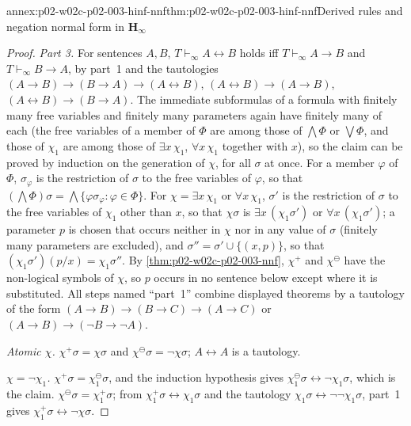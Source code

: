 \begin{annexitem}{annex:p02-w02c-p02-003-hinf-nnf}{thm:p02-w02c-p02-003-hinf-nnf}{Derived rules and negation normal form in \(\mathbf H_{\infty}\)}
\begin{proof}
\emph{Part 3.}  For sentences \(A,B\), \(T\vdash_{\infty}A\leftrightarrow B\)
holds iff \(T\vdash_{\infty}A\to B\) and \(T\vdash_{\infty}B\to A\), by
part~1 and the tautologies \((A\to B)\to(B\to A)\to(A\leftrightarrow B)\),
\((A\leftrightarrow B)\to(A\to B)\), \((A\leftrightarrow B)\to(B\to A)\).
The immediate subformulas of a formula with finitely many free variables
and finitely many parameters again have finitely many of each (the free
variables of a member of \(\Phi\) are among those of \(\bigwedge\Phi\) or
\(\bigvee\Phi\), and those of \(\chi_1\) are among those of
\(\exists x\,\chi_1\), \(\forall x\,\chi_1\) together with \(x\)), so the
claim can be proved by induction on the generation of \(\chi\), for all
\(\sigma\) at once.  For a member \(\varphi\) of \(\Phi\),
\(\sigma_\varphi\) is the restriction of \(\sigma\) to the free variables of
\(\varphi\), so that \((\bigwedge\Phi)\sigma=\bigwedge\{\varphi\sigma_\varphi:
\varphi\in\Phi\}\).  For \(\chi=\exists x\,\chi_1\) or \(\forall x\,\chi_1\),
\(\sigma'\) is the restriction of \(\sigma\) to the free variables of
\(\chi_1\) other than \(x\), so that \(\chi\sigma\) is
\(\exists x\,(\chi_1\sigma')\) or \(\forall x\,(\chi_1\sigma')\); a parameter
\(p\) is chosen that occurs neither in \(\chi\) nor in any value of
\(\sigma\) (finitely many parameters are excluded), and
\(\sigma''=\sigma'\cup\{(x,p)\}\), so that
\((\chi_1\sigma')(p/x)=\chi_1\sigma''\).  By \cref{thm:p02-w02c-p02-003-nnf},
\(\chi^{+}\) and \(\chi^{\ominus}\) have the non-logical symbols of
\(\chi\), so \(p\) occurs in no sentence below except where it is
substituted.  All steps named ``part~1'' combine displayed theorems by a
tautology of the form \((A\to B)\to(B\to C)\to(A\to C)\) or
\((A\to B)\to(\neg B\to\neg A)\).

\emph{Atomic \(\chi\).}  \(\chi^{+}\sigma=\chi\sigma\) and
\(\chi^{\ominus}\sigma=\neg\chi\sigma\); \(A\leftrightarrow A\) is a
tautology.

\emph{\(\chi=\neg\chi_1\).}  \(\chi^{+}\sigma=\chi_1^{\ominus}\sigma\), and
the induction hypothesis gives
\(\chi_1^{\ominus}\sigma\leftrightarrow\neg\chi_1\sigma\), which is the
claim.  \(\chi^{\ominus}\sigma=\chi_1^{+}\sigma\); from
\(\chi_1^{+}\sigma\leftrightarrow\chi_1\sigma\) and the tautology
\(\chi_1\sigma\leftrightarrow\neg\neg\chi_1\sigma\), part~1 gives
\(\chi_1^{+}\sigma\leftrightarrow\neg\chi\sigma\).


\end{proof}
\end{annexitem}
